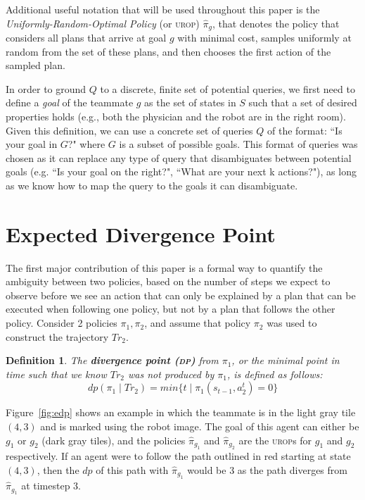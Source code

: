 \documentclass[letterpaper]{article}
\newtheorem{definition}{Definition}
\begin{document}
Additional useful notation that will be used throughout this paper is the \emph{Uniformly-Random-Optimal Policy} (or \textsc{urop}) $\hat{\pi}_{g}$, that denotes the policy that considers all plans that arrive at goal $g$ with minimal cost, samples uniformly at random from the set of these plans, and then chooses the first action of the sampled plan. 

In order to ground $Q$ to a discrete, finite set of potential queries, we first need to define a \emph{goal} of the teammate $g$ as the set of states in $S$ such that a set of desired properties holds (e.g., both the physician and the robot are in the right room). Given this definition, we can use a concrete set of queries $Q$ of the format: ``Is your goal in $G$?" where $G$ is a subset of possible goals. This format of queries was chosen as it can replace any type of query that disambiguates between potential goals (e.g. ``Is your goal on the right?", ``What are your next k actions?"), as long as we know how to map the query to the goals it can disambiguate.


\section{Expected Divergence Point}
The first major contribution of this paper is a formal way to quantify the ambiguity between two policies, based on the number of steps we expect to observe before we see an action that can only be explained by a plan that can be executed when following one policy, but not by a plan that follows the other policy. Consider 2 policies $\pi_1,\pi_2$, %
and assume that policy $\pi_2$ was used to construct the trajectory $Tr_2$.  %
\begin{definition}
The \textbf{divergence point (\textsc{dp})} from $\pi_1$, or the minimal point in time such that we know $Tr_2$ was not produced by $\pi_1$, is defined as follows:
\begin{equation*}
    dp(\pi_1 \mid Tr_2) = min\{t \mid \pi_1(s_{t-1}, a_2^t) = 0\}
\end{equation*}
\end{definition}

Figure~\ref{fig:edp} shows an example in which the teammate is in the light gray tile $(4,3)$ and is marked using the robot image. The goal of this agent can either be $g_1$ or $g_2$ (dark gray tiles), and the policies $\hat{\pi}_{g_1}$ and $\hat{\pi}_{g_2}$ are the \textsc{urop}s for  $g_1$ and $g_2$ respectively.
If an agent were to follow the path outlined in red starting at state $(4,3)$, then the $dp$ of this path with $\hat{\pi}_{g_1}$ would be 3 as the path diverges from $\hat{\pi}_{g_1}$ at timestep 3. 
\end{document}
